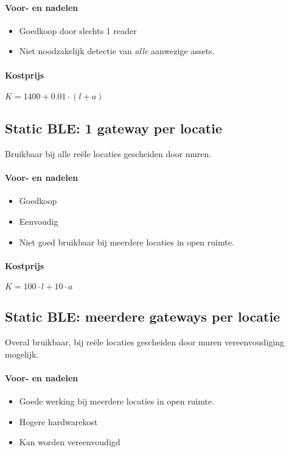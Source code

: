 \paragraph{Voor- en nadelen}
\begin{itemize}
	\color{ForestGreen}
	\item Goedkoop door slechts 1 reader
	\color{RedOrange}
	\item Niet noodzakelijk detectie van \emph{alle} aanwezige assets.
\end{itemize}
\paragraph{Kostprijs}
\(K = 1400 + 0.01 \cdot (l + a)\)

\subsection{Static BLE: 1 gateway per locatie}
Bruikbaar bij alle reële locaties gescheiden door muren.
\paragraph{Voor- en nadelen}
\begin{itemize}
	\color{ForestGreen}
	\item Goedkoop
	\item Eenvoudig
	\color{RedOrange}
	\item Niet goed bruikbaar bij meerdere locaties in open ruimte.
\end{itemize}
\paragraph{Kostprijs}
\(K = 100 \cdot l + 10 \cdot a\)

\subsection{Static BLE: meerdere gateways per locatie}
Overal bruikbaar, bij reële locaties gescheiden door muren vereenvoudiging mogelijk.
\paragraph{Voor- en nadelen}
\begin{itemize}
	\color{ForestGreen}
	\item Goede werking bij meerdere locaties in open ruimte.
	\color{RedOrange}
	\item Hogere hardwarekost
	\item Kan worden vereenvoudigd
\end{itemize}
